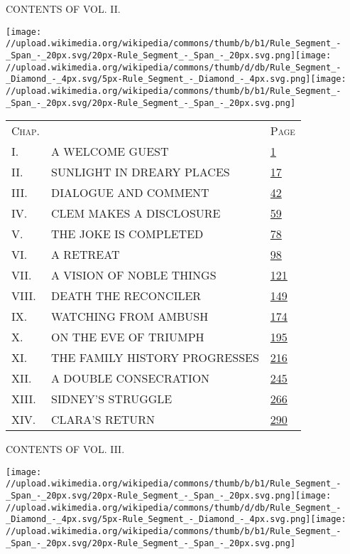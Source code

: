 {}

{}

{CONTENTS OF VOL. II.}

\texttt{[image: //upload.wikimedia.org/wikipedia/commons/thumb/b/b1/Rule\_Segment\_-\_Span\_-\_20px.svg/20px-Rule\_Segment\_-\_Span\_-\_20px.svg.png]}\texttt{[image: //upload.wikimedia.org/wikipedia/commons/thumb/d/db/Rule\_Segment\_-\_Diamond\_-\_4px.svg/5px-Rule\_Segment\_-\_Diamond\_-\_4px.svg.png]}\texttt{[image: //upload.wikimedia.org/wikipedia/commons/thumb/b/b1/Rule\_Segment\_-\_Span\_-\_20px.svg/20px-Rule\_Segment\_-\_Span\_-\_20px.svg.png]}

\begin{longtable}[]{@{}lll@{}}
\toprule
\textsc{Chap.} & & \textsc{Page}\tabularnewline
I. & A WELCOME GUEST &
\href{/wiki/The_Nether_World/Volume_2/Chapter_1\#1}{1}\tabularnewline
II. & SUNLIGHT IN DREARY PLACES &
\href{/wiki/The_Nether_World/Volume_2/Chapter_2\#17}{17}\tabularnewline
III. & DIALOGUE AND COMMENT &
\href{/wiki/The_Nether_World/Volume_2/Chapter_3\#42}{42}\tabularnewline
IV. & CLEM MAKES A DISCLOSURE &
\href{/wiki/The_Nether_World/Volume_2/Chapter_4\#59}{59}\tabularnewline
V. & THE JOKE IS COMPLETED &
\href{/wiki/The_Nether_World/Volume_2/Chapter_5\#78}{78}\tabularnewline
VI. & A RETREAT &
\href{/wiki/The_Nether_World/Volume_2/Chapter_6\#98}{98}\tabularnewline
VII. & A VISION OF NOBLE THINGS &
\href{/wiki/The_Nether_World/Volume_2/Chapter_7\#121}{121}\tabularnewline
VIII. & DEATH THE RECONCILER &
\href{/wiki/The_Nether_World/Volume_2/Chapter_8\#149}{149}\tabularnewline
IX. & WATCHING FROM AMBUSH &
\href{/wiki/The_Nether_World/Volume_2/Chapter_9\#174}{174}\tabularnewline
X. & ON THE EVE OF TRIUMPH &
\href{/wiki/The_Nether_World/Volume_2/Chapter_10\#195}{195}\tabularnewline
XI. & THE FAMILY HISTORY PROGRESSES &
\href{/wiki/The_Nether_World/Volume_2/Chapter_11\#216}{216}\tabularnewline
XII. & A DOUBLE CONSECRATION &
\href{/wiki/The_Nether_World/Volume_2/Chapter_12\#245}{245}\tabularnewline
XIII. & SIDNEY'S STRUGGLE &
\href{/wiki/The_Nether_World/Volume_2/Chapter_13\#266}{266}\tabularnewline
XIV. & CLARA'S RETURN &
\href{/wiki/The_Nether_World/Volume_2/Chapter_14\#290}{290}\tabularnewline
\bottomrule
\end{longtable}

{}

{CONTENTS OF VOL. III.}

\texttt{[image: //upload.wikimedia.org/wikipedia/commons/thumb/b/b1/Rule\_Segment\_-\_Span\_-\_20px.svg/20px-Rule\_Segment\_-\_Span\_-\_20px.svg.png]}\texttt{[image: //upload.wikimedia.org/wikipedia/commons/thumb/d/db/Rule\_Segment\_-\_Diamond\_-\_4px.svg/5px-Rule\_Segment\_-\_Diamond\_-\_4px.svg.png]}\texttt{[image: //upload.wikimedia.org/wikipedia/commons/thumb/b/b1/Rule\_Segment\_-\_Span\_-\_20px.svg/20px-Rule\_Segment\_-\_Span\_-\_20px.svg.png]}

